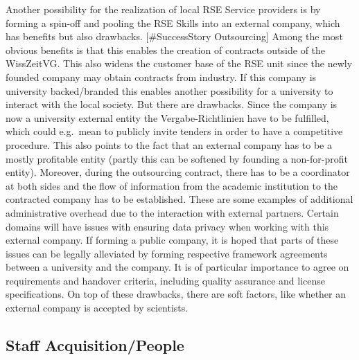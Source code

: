 \documentclass[a4paper]{article}
\begin{document}
Another possibility for the realization of local RSE Service providers is by forming a spin-off and pooling the RSE Skills into an external company, which has benefits but also drawbacks. [\#SuccessStory Outsourcing]
Among the most obvious benefits is that this enables the creation of contracts outside of the WissZeitVG.\@
This also widens the customer base of the RSE unit since the newly founded company may obtain contracts from industry.
If this company is university backed/branded this enables another possibility for a university to interact with the local society.
But there are drawbacks.
Since the company is now a university external entity the Vergabe-Richtlinien have to be fulfilled, which could e.g.\ mean to publicly invite tenders in order to have a competitive procedure.
This also points to the fact that an external company has to be a mostly profitable entity (partly this can be softened by founding a non-for-profit entity).
Moreover, during the outsourcing contract, there has to be a coordinator at both sides and the flow of information from the academic institution to the contracted company has to be established.
These are some examples of additional administrative overhead due to the interaction with external partners.
Certain domains will have issues with ensuring data privacy when working with this external company.
If forming a public company, it is hoped that parts of these issues can be legally alleviated by forming respective framework agreements between a university and the company.
It is of particular importance to agree on requirements and handover criteria, including quality assurance and license specifications.
On top of these drawbacks, there are soft factors, like whether an external company is accepted by scientists.

\subsection{Staff Acquisition/People}
\end{document}
